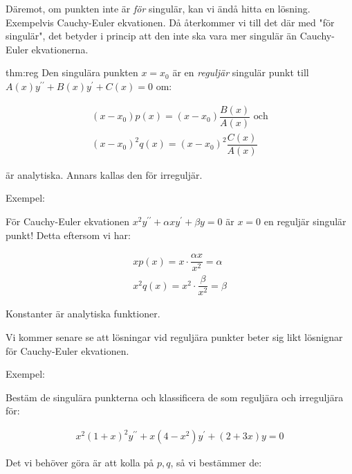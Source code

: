 \noindent Däremot, om punkten inte är \textit{för} singulär, kan vi ändå hitta en lösning. Exempelvis Cauchy-Euler ekvationen. Då återkommer vi till det där med "för singulär", det betyder i princip att den inte ska vara mer singulär än Cauchy-Euler ekvationerna.
\par\bigskip

\begin{theo}{thm:reg}
  Den singulära punkten $x = x_0$ är en \textit{reguljär} singulär punkt till $A(x)y^{\prime\prime}+B(x)y^{\prime}+C(x)=0$ om:

  \begin{equation*}
    \begin{gathered}
      (x-x_0)p(x)=(x-x_0)\dfrac{B(x)}{A(x)}\text{ och}\\
      (x-x_0)^2q(x)=(x-x_0)^2\dfrac{C(x)}{A(x)}
    \end{gathered}
  \end{equation*}\par
  \noindent är analytiska. Annars kallas den för irreguljär.
\end{theo}
\par\bigskip
\noindent Exempel:\par
\noindent För Cauchy-Euler ekvationen $x^2y^{\prime\prime}+\alpha xy^{\prime}+\beta y = 0$ är $x=0$ en reguljär singulär punkt! Detta eftersom vi har:


\begin{equation*}
  \begin{gathered}
    xp(x) = x\cdot\dfrac{\alpha x}{x^2} = \alpha\\
    x^2q(x) = x^2\cdot\dfrac{\beta}{x^2} =\beta
  \end{gathered}
\end{equation*}\par
\noindent Konstanter är analytiska funktioner.
\par\bigskip
\noindent Vi kommer senare se att lösningar vid reguljära punkter beter sig likt lösnignar för Cauchy-Euler ekvationen.
\par\bigskip
\noindent Exempel:\par
\noindent Bestäm de singulära punkterna och klassificera de som reguljära och irreguljära för:

\begin{equation*}
  \begin{gathered}
    x^2(1+x)^2y^{\prime\prime}+x(4-x^2)y^{\prime}+(2+3x)y=0
  \end{gathered}
\end{equation*}\par
\noindent Det vi behöver göra är att kolla på $p, q$, så vi bestämmer de:


